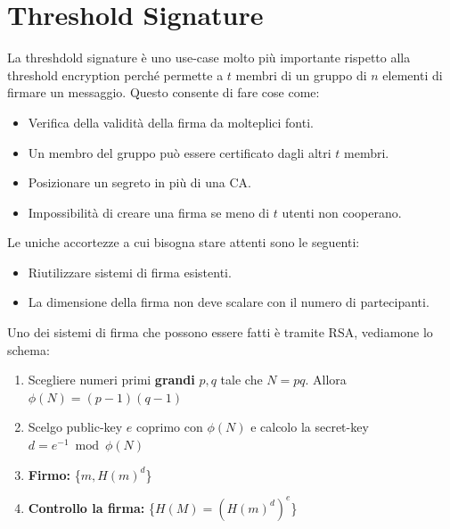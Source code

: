 \section{Threshold Signature}
La threshdold signature è uno use-case molto più importante rispetto alla threshold encryption perché permette a $t$ membri di un gruppo di $n$ elementi di firmare un messaggio. Questo consente di fare cose come:
\begin{itemize}
    \item Verifica della validità della firma da molteplici fonti.
    \item Un membro del gruppo può essere certificato dagli altri $t$ membri.
    \item Posizionare un segreto in più di una CA.
    \item Impossibilità di creare una firma se meno di $t$ utenti non cooperano.
\end{itemize}
Le uniche accortezze a cui bisogna stare attenti sono le seguenti: 
\begin{itemize}
    \item Riutilizzare sistemi di firma esistenti.
    \item La dimensione della firma non deve scalare con il numero di partecipanti.
\end{itemize}
Uno dei sistemi di firma che possono essere fatti è tramite RSA, vediamone lo schema:
\begin{definition}\label{def:rsasign}
\begin{enumerate}
    \item Scegliere numeri primi \textbf{grandi} $p,q$ tale che $N=pq$. Allora $\phi(N)=(p-1)(q-1)$
    \item Scelgo public-key $e$ coprimo con $\phi(N)$ e calcolo la secret-key $d=e^{-1}\bmod\phi(N)$
    \item \textbf{Firmo:} \{$m,H(m)^d$\}
    \item \textbf{Controllo la firma:} \{$H(M)=(H(m)^d)^e$\}
\end{enumerate}
\end{definition}

